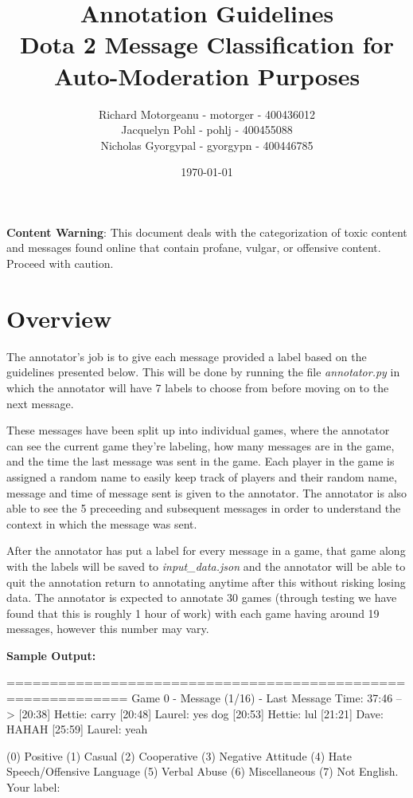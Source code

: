 \documentclass[11pt, letterpaper, notitlepage]{article}
\title{Annotation Guidelines \\ Dota 2 Message Classification for Auto-Moderation Purposes}
\author{Richard Motorgeanu - motorger - 400436012\\ Jacquelyn Pohl - pohlj - 400455088\\ Nicholas Gyorgypal - gyorgypn - 400446785}
\date{\today}
\begin{document}
\maketitle


\vspace{6em}

\large
\textbf{Content Warning}: This document deals with the categorization of toxic content and messages found online that contain profane, vulgar, or offensive content. Proceed with caution.

\vspace{2em}

\newpage

\section[1]{Overview}

The annotator's job is to give each message provided a label based on the guidelines presented below.
This will be done by running the file \textit{annotator.py} in which the annotator will have 7 labels to choose from before moving on to the next message.

These messages have been split up into individual games, where the annotator can see the current game they're labeling, how many messages are in the game, and the time the last message was sent in the game.
Each player in the game is assigned a random name to easily keep track of players and their random name, message and time of message sent is given to the annotator.
The annotator is also able to see the 5 preceeding and subsequent messages in order to understand the context in which the message was sent.

After the annotator has put a label for every message in a game, that game along with the labels will be saved to \textit{input\_data.json} and the annotator will be able to quit the annotation return to annotating anytime after this without risking losing data.
The annotator is expected to annotate 30 games (through testing we have found that this is roughly 1 hour of work) with each game having around 19 messages, however this number may vary.

\vspace{2em}

\textbf{Sample Output:}
\begin{python}
============================================================
Game 0 - Message (1/16) - Last Message Time: 37:46
--> [20:38] Hettie: carry
    [20:48] Laurel: yes dog
    [20:53] Hettie: lul
    [21:21] Dave: HAHAH
    [25:59] Laurel: yeah 

(0) Positive (1) Casual (2) Cooperative (3) Negative Attitude (4) Hate Speech/Offensive Language (5) Verbal Abuse (6) Miscellaneous (7) Not English.
Your label: 
\end{python}
\end{document}
